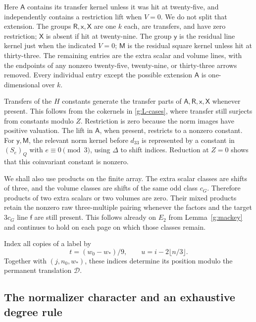 \documentclass[11pt]{article}
\theoremstyle{definition}
\theoremstyle{remark}
\numberwithin{equation}{section}
\begin{document}
Here $\mathsf A$ contains its transfer kernel unless it was
hit at twenty-five, and independently contains a restriction
lift when $V=0$.  We do not split that extension.  The groups
$\mathsf R,\mathsf x,\mathsf X$ are one $k$ each,
are transfers, and have zero restriction; $\mathsf X$ is
absent if hit at twenty-nine.  The group $\mathsf y$ is
the residual line kernel just when the indicated $V=0$;
$\mathsf M$ is the residual square kernel unless hit at
thirty-three.  The remaining entries are the extra scalar
and volume lines, with the endpoints of any nonzero
twenty-five, twenty-nine, or thirty-three arrows removed.
Every individual entry except the possible extension
$\mathsf A$ is one-dimensional over $k$.

Transfers of the $H$ constants generate the transfer parts of
$\mathsf A,\mathsf R,\mathsf x,\mathsf X$ whenever
present.  This follows from the cokernels in
\eqref{g:L-cases}, where transfer still surjects from
constants modulo $Z$.  Restriction is zero because the
norm images have positive valuation.  The lift in
$\mathsf A$, when present, restricts to a nonzero
constant.  For $\mathsf y,\mathsf M$, the relevant
norm kernel before $d_{33}$ is represented by a constant
in $(S_e)_Q$ with $e\equiv0\pmod3$, using $\Delta$
to shift indices.  Reduction at $Z=0$ shows that this
coinvariant constant is nonzero.

We shall also use products on the finite array.  The extra
scalar classes are shifts of three, and the volume classes
are shifts of the same odd class $c_G$.  Therefore products
of two extra scalars or two volumes are zero.  Their mixed
products retain the nonzero raw three-multiple pairing
whenever the factors and the target $3c_G$ line
$\mathsf f$ are still present.  This follows already on
$E_2$ from Lemma~\ref{g:mackey} and continues to hold
on each page on which those classes remain.

Index all copies of a label by
\begin{equation}\label{g:copy-index}
 t=(w_0-w_*)/9,\qquad u=i-2\lfloor n/3\rfloor.
\end{equation}
Together with $(j,n_0,w_*)$, these indices determine its
position modulo the permanent translation $\mathcal D$.

\subsection{The normalizer character and an exhaustive degree rule}
\end{document}
